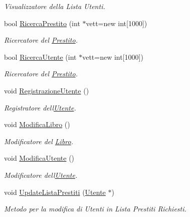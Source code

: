 \begin{DoxyCompactItemize}
\begin{DoxyCompactList}\small\item\em Visualizzatore della Lista Utenti. \end{DoxyCompactList}\item 
bool \mbox{\hyperlink{class_persona_ab06e2688ff0eb5c51177a44d33232070}{Ricerca\+Prestito}} (int $\ast$vett=new int\mbox{[}1000\mbox{]})
\begin{DoxyCompactList}\small\item\em Ricercatore del \mbox{\hyperlink{class_prestito}{Prestito}}. \end{DoxyCompactList}\item 
bool \mbox{\hyperlink{class_persona_a11bc0159627eb83be83b00c56ff1a3f9}{Ricerca\+Utente}} (int $\ast$vett=new int\mbox{[}1000\mbox{]})
\begin{DoxyCompactList}\small\item\em Ricercatore del \mbox{\hyperlink{class_prestito}{Prestito}}. \end{DoxyCompactList}\item 
void \mbox{\hyperlink{class_persona_ad46f21f01f3c49c7de0bb5bb0fca0251}{Registrazione\+Utente}} ()
\begin{DoxyCompactList}\small\item\em Registratore dell\textquotesingle{}\mbox{\hyperlink{class_utente}{Utente}}. \end{DoxyCompactList}\item 
void \mbox{\hyperlink{class_persona_a2da81a9fb38cf71e51a67efdb3510b13}{Modifica\+Libro}} ()
\begin{DoxyCompactList}\small\item\em Modificatore del \mbox{\hyperlink{class_libro}{Libro}}. \end{DoxyCompactList}\item 
void \mbox{\hyperlink{class_persona_aba5185684ebc81901b47abd587d01465}{Modifica\+Utente}} ()
\begin{DoxyCompactList}\small\item\em Modificatore dell\textquotesingle{}\mbox{\hyperlink{class_utente}{Utente}}. \end{DoxyCompactList}\item 
\mbox{\label{class_persona_a49b4f6c55bf2cff47bb23478d6f160a1}} 
void \mbox{\hyperlink{class_persona_a49b4f6c55bf2cff47bb23478d6f160a1}{Update\+Lista\+Prestiti}} (\mbox{\hyperlink{class_utente}{Utente}} $\ast$)
\begin{DoxyCompactList}\small\item\em Metodo per la modifica di Utenti in Lista Prestiti Richiesti. \end{DoxyCompactList}\item 

\end{DoxyCompactItemize}
